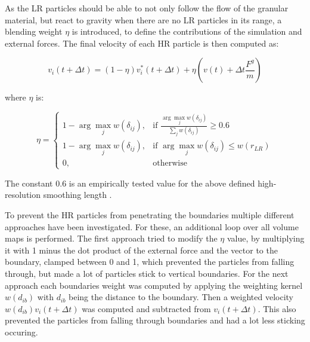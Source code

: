 \documentclass[intern]{cgMA}
\begin{document}
    As the LR particles should be able to not only follow the flow of the granular material, but react to gravity when there are no LR particles in its range, a blending weight $\eta$ is introduced, to define the contributions of the simulation and external forces. The final velocity of each HR particle is then computed as:

    \begin{equation}
        v_i(t + \Delta t)  = (1 - \eta)v_i^*(t + \Delta t) + \eta(v(t) + \Delta t \frac{F^g}{m})
    \end{equation}

    where $\eta$ is:

    \begin{equation}
        \eta = 
        \begin{cases}
            1 - \arg \max_j w(\delta_{ij}),& \text{if } \frac{\arg \max_j w(\delta_{ij})}{\sum_j w(\delta_{ij})} \geq 0.6 \\
            1 - \arg \max_j w(\delta_{ij}),& \text{if } \arg \max_j w(\delta_{ij}) \leq w(r_{LR}) \\
            0,              & \text{otherwise}
        \end{cases}
    \end{equation}

    The constant $0.6$ is an empirically tested value for the above defined high-resolution smoothing length \cite{10.2312:PE:vriphys:vriphys12:053-060}. 
    
    To prevent the HR particles from penetrating the boundaries multiple different approaches have been investigated. For these, an additional loop over all volume maps is performed. The first approach tried to modify the $\eta$ value, by multiplying it with 1 minus the dot product of the external force and the vector to the boundary, clamped between 0 and 1, which prevented the particles from falling through, but made a lot of particles stick to vertical boundaries. For the next approach each boundaries weight was computed by applying the weighting kernel $w(d_{ib})$ with $d_{ib}$ being the distance to the boundary. Then a weighted velocity $w(d_{ib}) v_i(t + \Delta t)$ was computed and subtracted from $v_i(t + \Delta t)$. This also prevented the particles from falling through boundaries and had a lot less sticking occuring.
\end{document}
